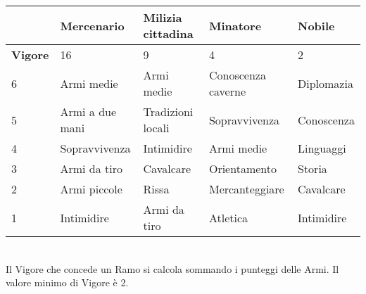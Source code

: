 \documentclass[12pt,a4paper,twoside,openany]{book}
\begin{document}
\begin{tabular}{|l|l|l|l|l|}
&\textbf{Mercenario}&\textbf{Milizia cittadina}&\textbf{Minatore}&\textbf{Nobile}\\\hline
\textbf{Vigore}&16&9&4&2\\\hline		
6&Armi medie		&Armi medie		&Conoscenza	caverne	&Diplomazia\\
5&Armi a due mani	&Tradizioni locali&Sopravvivenza	&Conoscenza\\
4&Sopravvivenza		&Intimidire		&Armi medie			&Linguaggi\\
3&Armi da tiro		&Cavalcare		&Orientamento		&Storia\\
2&Armi piccole		&Rissa			&Mercanteggiare		&Cavalcare\\
1&Intimidire		&Armi da tiro	&Atletica			&Intimidire\\\hline
							
\end{tabular}	\\

Il Vigore che concede un Ramo si calcola sommando i punteggi delle Armi. Il valore minimo di Vigore è 2.
\end{document}
